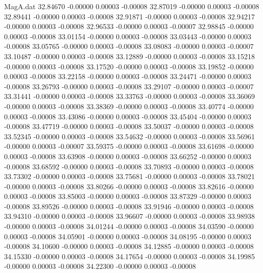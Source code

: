 \begin{filecontents}{MagA.dat}
  32.84670   -0.00000    0.00003   -0.00008
  32.87019   -0.00000    0.00003   -0.00008
  32.89441   -0.00000    0.00003   -0.00008
  32.91871   -0.00000    0.00003   -0.00008
  32.94217   -0.00000    0.00003   -0.00008
  32.96533   -0.00000    0.00003   -0.00007
  32.98845   -0.00000    0.00003   -0.00008
  33.01154   -0.00000    0.00003   -0.00008
  33.03443   -0.00000    0.00003   -0.00008
  33.05765   -0.00000    0.00003   -0.00008
  33.08083   -0.00000    0.00003   -0.00007
  33.10487   -0.00000    0.00003   -0.00008
  33.12889   -0.00000    0.00003   -0.00008
  33.15218   -0.00000    0.00003   -0.00008
  33.17520   -0.00000    0.00003   -0.00008
  33.19852   -0.00000    0.00003   -0.00008
  33.22158   -0.00000    0.00003   -0.00008
  33.24471   -0.00000    0.00003   -0.00008
  33.26793   -0.00000    0.00003   -0.00008
  33.29107   -0.00000    0.00003   -0.00007
  33.31441   -0.00000    0.00003   -0.00008
  33.33763   -0.00000    0.00003   -0.00008
  33.36069   -0.00000    0.00003   -0.00008
  33.38369   -0.00000    0.00003   -0.00008
  33.40774   -0.00000    0.00003   -0.00008
  33.43086   -0.00000    0.00003   -0.00008
  33.45404   -0.00000    0.00003   -0.00008
  33.47719   -0.00000    0.00003   -0.00008
  33.50037   -0.00000    0.00003   -0.00008
  33.52345   -0.00000    0.00003   -0.00008
  33.54632   -0.00000    0.00003   -0.00008
  33.56961   -0.00000    0.00003   -0.00007
  33.59375   -0.00000    0.00003   -0.00008
  33.61698   -0.00000    0.00003   -0.00008
  33.63908   -0.00000    0.00003   -0.00008
  33.66252   -0.00000    0.00003   -0.00008
  33.68592   -0.00000    0.00003   -0.00008
  33.70893   -0.00000    0.00003   -0.00008
  33.73302   -0.00000    0.00003   -0.00008
  33.75681   -0.00000    0.00003   -0.00008
  33.78021   -0.00000    0.00003   -0.00008
  33.80266   -0.00000    0.00003   -0.00008
  33.82616   -0.00000    0.00003   -0.00008
  33.85003   -0.00000    0.00003   -0.00008
  33.87329   -0.00000    0.00003   -0.00008
  33.89526   -0.00000    0.00003   -0.00008
  33.91946   -0.00000    0.00003   -0.00008
  33.94310   -0.00000    0.00003   -0.00008
  33.96607   -0.00000    0.00003   -0.00008
  33.98938   -0.00000    0.00003   -0.00008
  34.01244   -0.00000    0.00003   -0.00008
  34.03590   -0.00000    0.00003   -0.00008
  34.05901   -0.00000    0.00003   -0.00008
  34.08195   -0.00000    0.00003   -0.00008
  34.10600   -0.00000    0.00003   -0.00008
  34.12885   -0.00000    0.00003   -0.00008
  34.15330   -0.00000    0.00003   -0.00008
  34.17654   -0.00000    0.00003   -0.00008
  34.19985   -0.00000    0.00003   -0.00008
  34.22300   -0.00000    0.00003   -0.00008

\end{filecontents}

